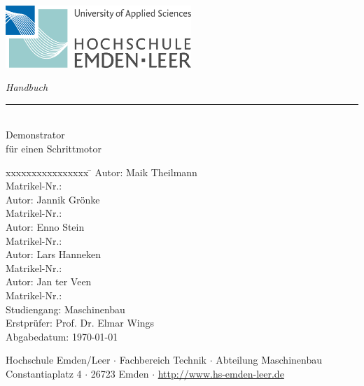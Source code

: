 %
%

\begin{titlepage}
    
    \begin{flushleft} 
        \includegraphics[width=7cm]{General/Logo_HS_Emden_Leer.jpg}
    \end{flushleft} 
    
    \begin{flushright}
        \vspace{2cm}
        \LARGE \textsl{Handbuch}\\
        \rule{0.6\textwidth}{0.4pt} ~\\
        \vspace{0.5cm}
        \textsf{\LARGE Demonstrator}\\
        \textsf{\LARGE für einen Schrittmotor}
    \end{flushright}
    
    \vspace{3cm}
    \large
    \begin{tabbing}
       xxxxxxxxxxxxxxxx \= \kill
       Autor:			\> Maik Theilmann \\
       Matrikel-Nr.:	 \\
       Autor:			\> Jannik Grönke \\
       Matrikel-Nr.:	 \\
       Autor:			\> Enno Stein \\
       Matrikel-Nr.:	 \\
       Autor:			\> Lars Hanneken \\
       Matrikel-Nr.:	 \\
       Autor:			\> Jan ter Veen \\
       Matrikel-Nr.:	 \\
       Studiengang: \> Maschinenbau \\ [0.5cm]
       Erstprüfer: \> Prof. Dr. Elmar Wings \\
        Abgabedatum: \> \today \\
    \end{tabbing}
    
    \vspace{3cm}
    \small
    \begin{center}
        Hochschule Emden/Leer $\cdot$ 
        Fachbereich Technik $\cdot$ 
        Abteilung Maschinenbau \\
        Constantiaplatz 4 $\cdot$ 
        26723 Emden $\cdot$ 
        \url{http://www.hs-emden-leer.de}
    \end{center}
    
\end{titlepage}

